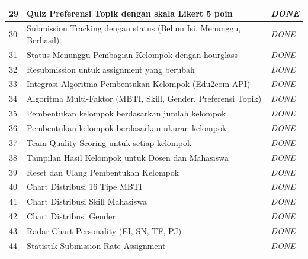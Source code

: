 \begin{longtable}{|p{}|p{}|p{}|}
	\hline
	29          & Quiz Preferensi Topik dengan skala Likert 5 poin                             & \textit{DONE}        \\
	\hline
	30          & Submission Tracking dengan status (Belum Isi, Menunggu, Berhasil)            & \textit{DONE}        \\
	\hline
	31          & Status Menunggu Pembagian Kelompok dengan hourglass                          & \textit{DONE}        \\
	\hline
	32          & Resubmission untuk assignment yang berubah                                   & \textit{DONE}        \\
	\hline
	33          & Integrasi Algoritma Pembentukan Kelompok (Edu2com API)                       & \textit{DONE}        \\
	\hline
	34          & Algoritma Multi-Faktor (MBTI, Skill, Gender, Preferensi Topik)               & \textit{DONE}        \\
	\hline
	35          & Pembentukan kelompok berdasarkan jumlah kelompok                             & \textit{DONE}        \\
	\hline
	36          & Pembentukan kelompok berdasarkan ukuran kelompok                             & \textit{DONE}        \\
	\hline
	37          & Team Quality Scoring untuk setiap kelompok                                   & \textit{DONE}        \\
	\hline
	38          & Tampilan Hasil Kelompok untuk Dosen dan Mahasiswa                            & \textit{DONE}        \\
	\hline
	39          & Reset dan Ulang Pembentukan Kelompok                                         & \textit{DONE}        \\
	\hline
	40          & Chart Distribusi 16 Tipe MBTI                                                & \textit{DONE}        \\
	\hline
	41          & Chart Distribusi Skill Mahasiswa                                             & \textit{DONE}        \\
	\hline
	42          & Chart Distribusi Gender                                                      & \textit{DONE}        \\
	\hline
	43          & Radar Chart Personality (EI, SN, TF, PJ)                                     & \textit{DONE}        \\
	\hline
	44          & Statistik Submission Rate Assignment                                         & \textit{DONE}        \\

\end{longtable}
